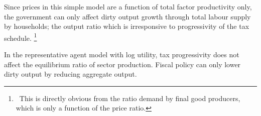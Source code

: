 Since prices in this simple model are a function of total factor productivity only, the government can only affect dirty output growth through total labour supply by households; the output ratio which is irresponsive to progressivity of the tax schedule.%
\footnote{\ This is directly obvious from the ratio demand by final good producers, which is only a function of the price ratio. }


	\begin{comment}
	To see this write:
\begin{align}
	\frac{d\left(\frac{Y_d}{Y_c}\right)}{d \tau_l}=\frac{Y_d}{Y_c}\left(\frac{\frac{dY_d}{Y_d}}{d \tau_l}-\frac{\frac{dY_c}{Y_c}}{d \tau_l}\right)=0
\end{align}
and observe that the percentage change in sector output is homogeneous. 
\begin{align}
	\frac{1}{Y_d}\frac{dY_d}{d \tau_l}= \frac{1}{L_d}\frac{d L_d}{d \tau_l}=\frac{1}{H}\frac{d H}{d \tau_l}\ \text{and} \ \frac{1}{Y_c}\frac{dY_c}{d \tau_l}= \frac{1}{L_c}\frac{d L_c}{d \tau_l}=\frac{1}{H}\frac{d H}{d \tau_l}.
\end{align}
\textbf{}
content...
\end{comment}






\begin{prop}
	In the representative agent model with log utility, tax progressivity does not affect the equilibrium ratio of sector production. Fiscal policy can only lower dirty output by reducing aggregate output.
\end{prop}

